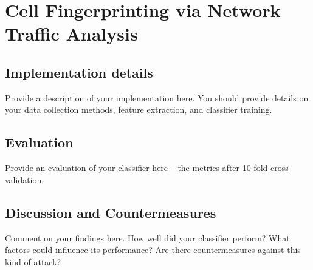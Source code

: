\documentclass[10pt,conference,compsocconf]{IEEEtran}
\begin{document}
\section{Cell Fingerprinting via Network Traffic Analysis}

\subsection{Implementation details}
Provide a description of your implementation here. You should provide details on your data collection methods, feature extraction, and classifier training.

\subsection{Evaluation}
Provide an evaluation of your classifier here -- the metrics after 10-fold cross validation.

\subsection{Discussion and Countermeasures}
Comment on your findings here. How well did your classifier perform? What factors could influence its performance? Are there countermeasures against this kind of attack?



\end{document}
